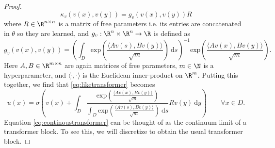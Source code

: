 {\begin{proof}
\[\kappa_v(v(x),v(y)) = g_v(v(x),v(y)) R\]
where \(R \in \R^{n \times n}\) is a matrix of free parameters i.e. its entries are concatenated in \(\theta\) so they are learned, and \(g_v: \R^n \times \R^n \to \R\) is defined as
\[g_v(v(x),v(y)) = \left ( \int_D \text{exp}\left( \frac{\langle A v(s), Bv(y) \rangle}{\sqrt{m}} \right ) \: \text{d}s \right )^{-1} \text{exp} \left ( \frac{\langle A v(x), Bv(y) \rangle}{\sqrt{m}} \right ).\]
Here \(A,B \in \R^{m \times n}\) are again matrices of free parameters, \(m \in \N\) is a hyperparameter, and \(\langle \cdot, \cdot \rangle\) is the Euclidean inner-product on \(\R^m\). Putting this together, we find that \eqref{eq:liketransformer} becomes
\begin{equation}
    \label{eq:continoustransformer}
    u(x) = \sigma \left ( v(x) + \int_D \frac{\text{exp} \left ( \frac{\langle A v(x), Bv(y) \rangle}{\sqrt{m}} \right )}{\int_D \text{exp}\left( \frac{\langle A v(s), Bv(y) \rangle}{\sqrt{m}} \right ) \: \text{d}s} R v(y) \: \text{d}y \right ) \qquad \forall x \in D.
\end{equation}
Equation \eqref{eq:continoustransformer} can be thought of as the continuum limit of a transformer block. To see this, we will discretize to obtain the usual transformer block.


\end{proof}}
